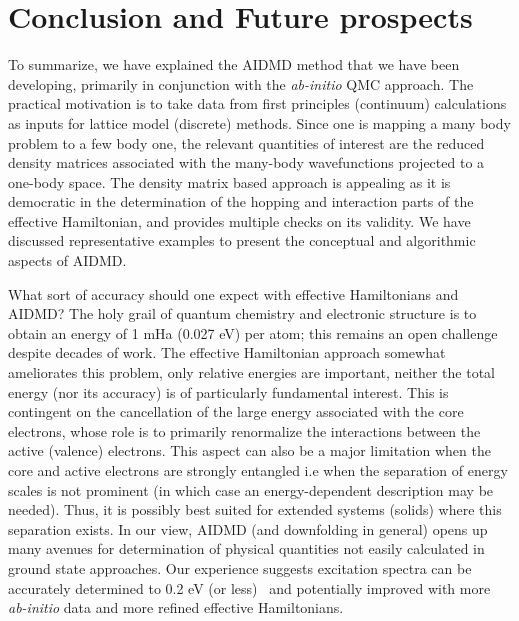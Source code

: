 \section{Conclusion and Future prospects}
To summarize, we have explained the AIDMD method that we have been developing, primarily in conjunction with the 
\emph{ab-initio} QMC approach. The practical motivation is to take data from first principles (continuum) 
calculations as inputs for lattice model (discrete) methods. 
Since one is mapping a many body problem to a few body one, the relevant quantities of interest are 
the reduced density matrices associated with the many-body wavefunctions projected to a one-body space. 
The density matrix based approach is appealing as it is democratic 
in the determination of the hopping and interaction parts of the effective Hamiltonian, and provides multiple 
checks on its validity. We have discussed representative examples to present the conceptual and algorithmic aspects of AIDMD. 

What sort of accuracy should one expect with effective Hamiltonians and AIDMD? The holy grail of quantum chemistry 
and electronic structure is to obtain an energy of 1 mHa (0.027 eV) per atom; this 
remains an open challenge despite decades of work. The effective Hamiltonian approach somewhat ameliorates 
this problem, only relative energies are important, neither the total energy (nor its accuracy) is of particularly 
fundamental interest. This is contingent on the cancellation of the large energy associated with the core electrons, 
whose role is to primarily renormalize the interactions between the active (valence) electrons. This aspect can also 
be a major limitation when the core and active electrons are strongly entangled i.e when the separation of energy 
scales is not prominent (in which case an energy-dependent description may be needed). 
Thus, it is possibly best suited for extended systems (solids) where this separation exists. 
In our view, AIDMD (and downfolding in general) opens up many avenues for determination of physical 
quantities not easily calculated in ground state approaches. Our experience suggests excitation spectra 
can be accurately determined to 0.2 eV (or less)~\cite{Changlani2015} and potentially improved with 
more \emph{ab-initio} data and more refined effective Hamiltonians.  

